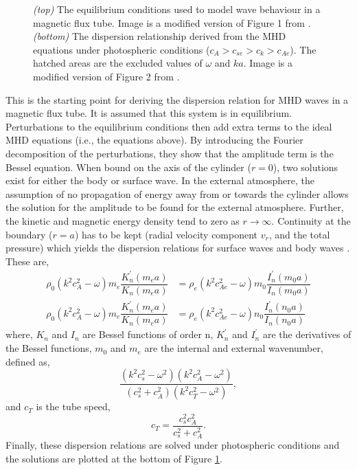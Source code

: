 \begin{figure}
\begin{subfigure}[b]{0.65\textwidth}
        \end{subfigure}
        \caption{
                \textit{(top)} The equilibrium conditions used to model wave behaviour in a magnetic flux tube.
                Image is a modified version of Figure 1 from \cite{WPMC}.
                \textit{(bottom)} The dispersion relationship derived from the MHD equations under photospheric conditions ($c_A > c_{se} > c_k > c_{Ae} $).
                The hatched areas are the excluded  values of $\omega$ and $ka$.
                Image is a modified version of Figure 2 from \cite{WPMC}.
                }
        \label{fig:fluxtube}
    \end{figure}
    
    This is the starting point for deriving the dispersion relation for MHD waves in a magnetic flux tube.
    It is assumed that this system is in equilibrium.
    Perturbations to the equilibrium conditions then add extra terms to the ideal MHD equations (i.e., the equations above).
    By introducing the Fourier decomposition of the perturbations, they show that the amplitude term is the Bessel equation.
    When bound on the axis of the cylinder ($r=0$), two solutions exist for either the body or surface wave.
    In the external atmosphere, the assumption of no propagation of energy away from or towards the cylinder allows the solution for the amplitude to be found for the external atmosphere.
    Further, the kinetic and magnetic energy density tend to zero as $r\rightarrow\infty$.
    Continuity at the boundary ($r=a$) has to be kept (radial velocity component $v_r$, and the total pressure) which yields the dispersion relations for surface waves and body waves \citep{WPMC}.
    These are,
    \begin{align}
        \rho_0 (k^2 c_A^2 - \omega)m_e \dfrac{K_n^\prime(m_e a)}{K_n(m_e a)} &= \rho_e (k^2 c_{Ae}^2 - \omega)m_0 \dfrac{I_n^\prime(m_0 a)}{I_n(m_0 a)} \tag{Surface, m$_0^2 > 0$} \\
        \rho_0 (k^2 c_A^2 - \omega)m_e \dfrac{K_n^\prime(m_e a)}{K_n(m_e a)} &= \rho_e (k^2 c_{Ae}^2 - \omega)n_0 \dfrac{I_n^\prime(n_0 a)}{I_n(n_0 a)} \tag{Body, m$_0^2 = -n_0 < 0$} 
    \end{align}
    where, $K_n$ and $I_n$ are Bessel functions of order n, $K_n^\prime$ and $I_n^\prime$ are the derivatives of the Bessel functions, $m_0$ and $m_e$ are the internal and external wavenumber, defined as, $$\dfrac{(k^2 c_{s}^2 - \omega^2)(k^2 c_{A}^2 - \omega^2)}{(c_{s}^2 + c_{A}^2)(k^2 c_{T}^2 - \omega^2)},$$ and $c_{T}$ is the tube speed, $$c_{T} = \dfrac{c_s^2 c_A^2}{c_s^2 + c_A^2}.$$
    Finally, these dispersion relations are solved under photospheric conditions and the solutions are plotted at the bottom of Figure \ref{fig:fluxtube}.
        
